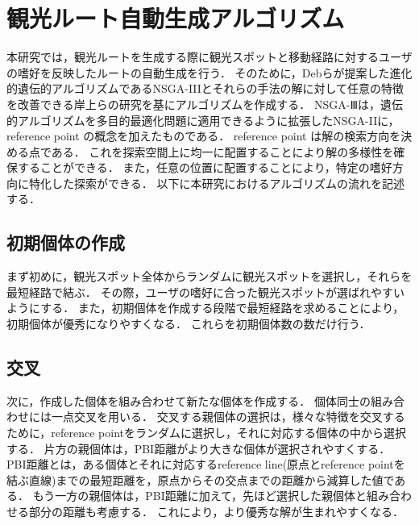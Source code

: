 \section{観光ルート自動生成アルゴリズム}\label{sec:観光ルート自動生成アルゴリズム}
本研究では，観光ルートを生成する際に観光スポットと移動経路に対するユーザの嗜好を反映したルートの自動生成を行う．
そのために，Debらが提案した進化的遺伝的アルゴリズムであるNSGA-I\hspace{-.1em}I\hspace{-.1em}Iとそれらの手法の解に対して任意の特徴を改善できる岸上らの研究を基にアルゴリズムを作成する．
NSGA-Ⅲは，遺伝的アルゴリズムを多目的最適化問題に適用できるように拡張したNSGA-I\hspace{-.1em}Iに， reference point の概念を加えたものである．
reference point は解の検索方向を決める点である．
これを探索空間上に均一に配置することにより解の多様性を確保することができる．
また，任意の位置に配置することにより，特定の嗜好方向に特化した探索ができる．
以下に本研究におけるアルゴリズムの流れを記述する．
\subsection{初期個体の作成}\label{sec:初期解の作成}
まず初めに，観光スポット全体からランダムに観光スポットを選択し，それらを最短経路で結ぶ．
その際，ユーザの嗜好に合った観光スポットが選ばれやすいようにする．
また，初期個体を作成する段階で最短経路を求めることにより，初期個体が優秀になりやすくなる．
これらを初期個体数の数だけ行う．
\subsection{交叉}\label{sec:交配}
次に，作成した個体を組み合わせて新たな個体を作成する．
個体同士の組み合わせには一点交叉を用いる．
交叉する親個体の選択は，様々な特徴を交叉するために，reference pointをランダムに選択し，それに対応する個体の中から選択する．
片方の親個体は，PBI距離がより大きな個体が選択されやすくする．
PBI距離とは，ある個体とそれに対応するreference line(原点とreference pointを結ぶ直線)までの最短距離を，原点からその交点までの距離から減算した値である．
もう一方の親個体は，PBI距離に加えて，先ほど選択した親個体と組み合わせる部分の距離も考慮する．
これにより，より優秀な解が生まれやすくなる．
